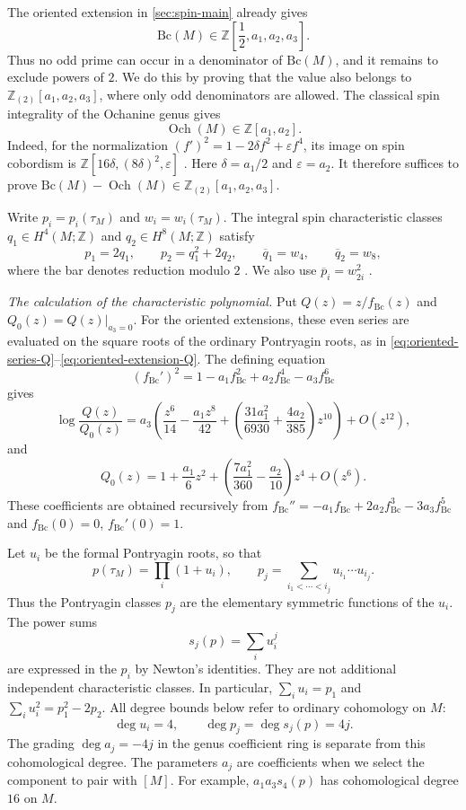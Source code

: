 \documentclass[14pt,dvipsnames]{extarticle}
\makeatletter
\numberwithin{equation}{subsection}
\theoremstyle{plain}
\theoremstyle{definition}
\theoremstyle{definition}
\renewenvironment{proof}[1][\proofname]{
 \par\pushQED{\qed}\normalfont
 \topsep6\p@\@plus6\p@\relax
 \trivlist\item[\hskip\labelsep\bfseries\itshape #1\@addpunct{.}]
}{\popQED\endtrivlist\@endpefalse}
\DeclareMathOperator{\Och}{Och}
\newcommand{\Bc}{\mathrm{Bc}}
\newcommand{\Ztwo}{\mathbb{Z}_{(2)}}
\makeatother
\begin{document}
\begin{proof}[Proof of \cref{thm:bc-spin-below24}]
The oriented extension in \cref{sec:spin-main} already gives
\begin{equation}\label{eq:spin-dyadic-values}
 \Bc(M)\in\mathbb Z\!\left[\frac12,a_1,a_2,a_3\right].
\end{equation}
Thus no odd prime can occur in a denominator of $\Bc(M)$, and it remains
to exclude powers of $2$. We do this by proving that the value also belongs
to $\Ztwo[a_1,a_2,a_3]$, where only odd denominators are allowed.
The classical spin integrality of the Ochanine genus gives
\[
 \Och(M)\in\mathbb Z[a_1,a_2].
\]
Indeed, for the normalization
$(f')^2=1-2\delta f^2+\varepsilon f^4$, its image on spin cobordism is
$\mathbb Z[16\delta,(8\delta)^2,\varepsilon]$
\cite[Introduction]{HH24}. Here $\delta=a_1/2$ and $\varepsilon=a_2$.
It therefore suffices to prove
$\Bc(M)-\Och(M)\in\Ztwo[a_1,a_2,a_3]$.

Write $p_i=p_i(\tau_M)$ and $w_i=w_i(\tau_M)$. The integral spin characteristic
classes $q_1\in H^4(M;\mathbb Z)$ and $q_2\in H^8(M;\mathbb Z)$ satisfy
\begin{equation}\label{eq:spin-characteristic-classes}
 p_1=2q_1,\qquad p_2=q_1^2+2q_2,\qquad
 \overline q_1=w_4,\qquad \overline q_2=w_8,
\end{equation}
where the bar denotes reduction modulo $2$
\cite[\S~5]{HHLZ22}. We also use
$\overline p_i=w_{2i}^2$ \cite[\S~15]{MS74}.

\emph{The calculation of the characteristic polynomial.}
Put $Q(z)=z/f_{\Bc}(z)$ and $Q_0(z)=Q(z)|_{a_3=0}$.
For the oriented extensions, these even series are evaluated on the square
roots of the ordinary Pontryagin roots, as in
\eqref{eq:oriented-series-Q}--\eqref{eq:oriented-extension-Q}.
The defining equation
\[
 (f_{\Bc}')^2=1-a_1f_{\Bc}^2+a_2f_{\Bc}^4-a_3f_{\Bc}^6
\]
gives
\begin{equation}\label{eq:spin-log-ratio}
 \log\frac{Q(z)}{Q_0(z)}
 =a_3\left(\frac{z^6}{14}-\frac{a_1z^8}{42}
  +\left(\frac{31a_1^2}{6930}+\frac{4a_2}{385}\right)z^{10}\right)
  +O(z^{12}),
\end{equation}
and
\[
 Q_0(z)=1+\frac{a_1}{6}z^2
  +\left(\frac{7a_1^2}{360}-\frac{a_2}{10}\right)z^4+O(z^6).
\]
These coefficients are obtained recursively from
$f_{\Bc}''=-a_1f_{\Bc}+2a_2f_{\Bc}^3-3a_3f_{\Bc}^5$ and
$f_{\Bc}(0)=0$, $f_{\Bc}'(0)=1$.

Let $u_i$ be the formal Pontryagin roots, so that
\[
 p(\tau_M)=\prod_i(1+u_i),\qquad
 p_j=\sum_{i_1<\cdots<i_j}u_{i_1}\cdots u_{i_j}.
\]
Thus the Pontryagin classes $p_j$ are the elementary symmetric functions
of the $u_i$. The power sums
\[
 s_j(p)=\sum_i u_i^j
\]
are expressed in the $p_i$ by Newton's identities. They are not additional
independent characteristic classes. In particular,
$\sum_i u_i=p_1$ and $\sum_i u_i^2=p_1^2-2p_2$.
All degree bounds below refer to ordinary cohomology on $M$:
\[
 \deg u_i=4,\qquad
 \deg p_j=\deg s_j(p)=4j.
\]
The grading $\deg a_j=-4j$ in the genus coefficient ring is separate from
this cohomological degree. The parameters $a_j$ are coefficients when we
select the component to pair with $[M]$. For example,
$a_1a_3s_4(p)$ has cohomological degree $16$ on $M$.


\end{proof}
\end{document}
